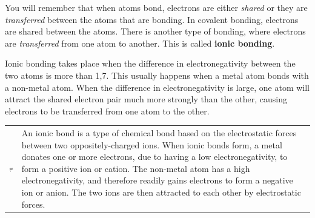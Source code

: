         
        \label{m38684*id142190}You will remember that when atoms bond, electrons are either \textsl{shared} or they are \textsl{transferred} between the atoms that are bonding. In covalent bonding, electrons are shared between the atoms. There is another type of bonding, where electrons are \textsl{transferred} from one atom to another. This is called \textbf{ionic bonding}.\par 
        \label{m38684*id142218}Ionic bonding takes place when the difference in electronegativity between the two atoms is more than 1,7. This usually happens when a metal atom bonds with a non-metal atom. When the difference in electronegativity is large, one atom will attract the shared electron pair much more strongly than the other, causing electrons to be transferred from one atom to the other.\par 
\label{m38684*fhsst!!!underscore!!!id456}\begin{definition}
	  \begin{tabular*}{15 cm}{m{15 mm}m{}}
	\hspace*{-50pt}  \includegraphics[width=0.5in]{col11305.imgs/psflag2.png}   & \Definition{   \label{id2430088}\textbf{ Ionic bond }} { \label{m38684*meaningfhsst!!!underscore!!!id456}
        An ionic bond is a type of chemical bond based on the electrostatic forces between two oppositely-charged ions. When ionic bonds form, a metal donates one or more electrons, due to having a low electronegativity, to form a positive ion or cation. The non-metal atom has a high electronegativity, and therefore readily gains electrons to form a negative ion or anion. The two ions are then attracted to each other by electrostatic forces.
 
         } 
      \end{tabular*}
      \end{definition}


